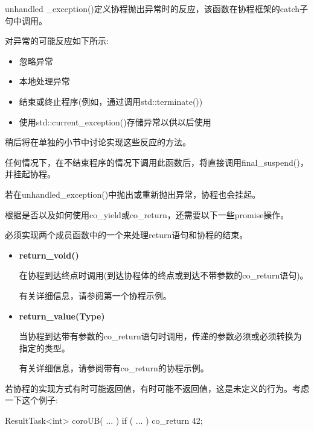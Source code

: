 
unhandled \_exception()定义协程抛出异常时的反应，该函数在协程框架的catch子句中调用。

对异常的可能反应如下所示:

\begin{itemize}
\item 
忽略异常

\item 
本地处理异常

\item 
结束或终止程序(例如，通过调用std::terminate())

\item 
使用std::current\_exception()存储异常以供以后使用
\end{itemize}

稍后将在单独的小节中讨论实现这些反应的方法。

任何情况下，在不结束程序的情况下调用此函数后，将直接调用final\_suspend()，并挂起协程。

若在unhandled\_exception()中抛出或重新抛出异常，协程也会挂起。


根据是否以及如何使用co\_yield或co\_return，还需要以下一些promise操作。


必须实现两个成员函数中的一个来处理return语句和协程的结束。

\begin{itemize}
\item 
\textbf{return\_void()}

在协程到达终点时调用(到达协程体的终点或到达不带参数的co\_return语句)。

有关详细信息，请参阅第一个协程示例。

\item 
\textbf{return\_value(Type)}

当协程到达带有参数的co\_return语句时调用，传递的参数必须或必须转换为指定的类型。

有关详细信息，请参阅带有co\_return的协程示例。
\end{itemize}

若协程的实现方式有时可能返回值，有时可能不返回值，这是未定义的行为。考虑一下这个例子:

\begin{cpp}
ResultTask<int> coroUB( ... )
{
	if ( ... ) {
		co_return 42;
	}
}
\end{cpp}

